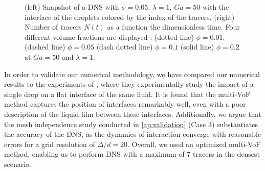 \begin{figure}[h!]
    \centering
    \caption{
    (left) Snapshot of a DNS with $\phi = 0.05$, $\lambda = 1$, $Ga = 50$ with the interface of the droplets colored by the index of the tracers.
    (right) Number of tracers $N(t)$ as a function the dimensionless time.
    Four different volume fractions are displayed : (dotted line) $\phi = 0.01$, (dashed line) $\phi = 0.05$ (dash dotted line) $\phi = 0.1$ (solid line) $\phi = 0.2$ at $Ga = 50$ and $\lambda = 1$. 
    }
    \label{fig:diagram}
\end{figure}


In order to validate our numerical methodology, we have compared our numerical results to the experiments of \citet{mohamed2003drop}, where they experimentally study the impact of a single drop on a flat interface of the same fluid. %
It is found that the multi-VoF method captures the position of interfaces remarkably well, even with a poor description of the liquid film between these interfaces.
Additionally, we argue that the mesh independence study conducted in \ref{ap:validation} (Case 3) substantiates the accuracy of the DNS, as the dynamics of interaction converge with reasonable errors for a grid resolution of $\Delta/d = 20$. 
Overall, we used an optimized multi-VoF method, enabling us to perform DNS with a maximum of 7 tracers in the densest scenario. 





